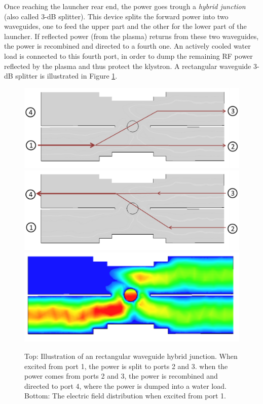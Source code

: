 Once reaching the launcher rear end, the power goes trough a \textit{hybrid junction} (also called 3-dB splitter). This device splits the forward power into two waveguides, one to feed the upper part and the other for the lower part of the launcher.  If reflected power (from the plasma) returns from these two waveguides, the power is recombined and directed to a fourth one. An actively cooled water load is connected to this fourth port, in order to dump the remaining RF power reflected by the plasma and thus protect the klystron. A rectangular waveguide 3-dB splitter is illustrated in Figure \ref{fig:hybridjunction1}. 

\begin{figure}[h]
	\centering
	\includegraphics[width=0.4\linewidth]{figures/chap1/HybridJunction1}
	\includegraphics[width=0.4\linewidth]{figures/chap1/HybridJunction2}
	\includegraphics[width=0.4\linewidth]{figures/chap1/HybridJunction_Efield}
	\caption{Top: Illustration of an rectangular waveguide hybrid junction. When excited from port 1, the power is split to ports 2 and 3. when the power comes from ports 2 and 3, the power is recombined and directed to port 4, where the power is dumped into a water load. Bottom: The electric field distribution when excited from port 1. }
	\label{fig:hybridjunction1}
\end{figure}



